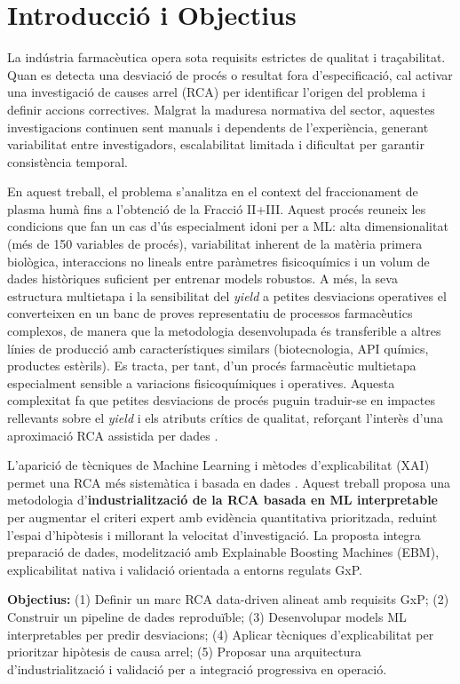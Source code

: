\section{Introducció i Objectius}

La indústria farmacèutica opera sota requisits estrictes de qualitat i traçabilitat. Quan es detecta una desviació de procés o resultat fora d'especificació, cal activar una investigació de causes arrel (RCA) per identificar l'origen del problema i definir accions correctives. Malgrat la maduresa normativa del sector, aquestes investigacions continuen sent manuals i dependents de l'experiència, generant variabilitat entre investigadors, escalabilitat limitada i dificultat per garantir consistència temporal.

En aquest treball, el problema s'analitza en el context del fraccionament de plasma humà fins a l'obtenció de la Fracció II+III. Aquest procés reuneix les condicions que fan un cas d'ús especialment idoni per a ML: alta dimensionalitat (més de 150 variables de procés), variabilitat inherent de la matèria primera biològica, interaccions no lineals entre paràmetres fisicoquímics i un volum de dades històriques suficient per entrenar models robustos. A més, la seva estructura multietapa i la sensibilitat del \emph{yield} a petites desviacions operatives el converteixen en un banc de proves representatiu de processos farmacèutics complexos, de manera que la metodologia desenvolupada és transferible a altres línies de producció amb característiques similars (biotecnologia, API químics, productes estèrils). Es tracta, per tant, d'un procés farmacèutic multietapa especialment sensible a variacions fisicoquímiques i operatives. Aquesta complexitat fa que petites desviacions de procés puguin traduir-se en impactes rellevants sobre el \emph{yield} i els atributs crítics de qualitat, reforçant l'interès d'una aproximació RCA assistida per dades \cite{cohn1946,burnouf2007_modern}.

L'aparició de tècniques de Machine Learning i mètodes d'explicabilitat (XAI) permet una RCA més sistemàtica i basada en dades \cite{shap_arxiv1705,lime_arxiv1602,doshi2017rigorous}. Aquest treball proposa una metodologia d'\textbf{industrialització de la RCA basada en ML interpretable} per augmentar el criteri expert amb evidència quantitativa prioritzada, reduint l'espai d'hipòtesis i millorant la velocitat d'investigació. La proposta integra preparació de dades, modelització amb Explainable Boosting Machines (EBM), explicabilitat nativa i validació orientada a entorns regulats GxP.

\textbf{Objectius:} (1) Definir un marc RCA data-driven alineat amb requisits GxP; (2) Construir un pipeline de dades reproduïble; (3) Desenvolupar models ML interpretables per predir desviacions; (4) Aplicar tècniques d'explicabilitat per prioritzar hipòtesis de causa arrel; (5) Proposar una arquitectura d'industrialització i validació per a integració progressiva en operació.
